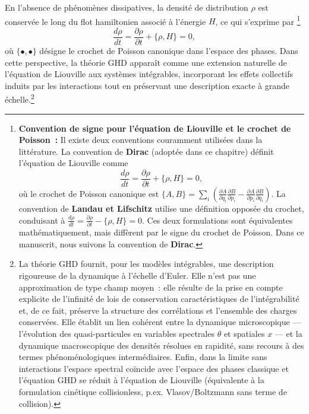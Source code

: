 En l’absence de phénomènes dissipatives, la densité de distribution $\rho$ est conservée le long du flot hamiltonien associé à l’énergie $H$, ce qui s’exprime par
\footnote{
	\textbf{Convention de signe pour l'équation de Liouville et le crochet de Poisson~:}
	Il existe deux conventions couramment utilisées dans la littérature. 
	La convention de \textbf{Dirac} (adoptée dans ce chapitre) définit l'équation de Liouville comme
	\[
	\frac{d\rho}{dt} = \frac{\partial\rho}{\partial t} + \{\rho, H\} = 0,
	\]
	où le crochet de Poisson canonique est $\{A,B\} = \sum_i \left(\frac{\partial A}{\partial q_i}\frac{\partial B}{\partial p_i} - \frac{\partial A}{\partial p_i}\frac{\partial B}{\partial q_i}\right)$.
	La convention de \textbf{Landau et Lifschitz} utilise une définition opposée du crochet, conduisant à $\frac{d\rho}{dt} = \frac{\partial\rho}{\partial t} - \{\rho, H\} = 0$.
	Ces deux formulations sont équivalentes mathématiquement, mais diffèrent par le signe du crochet de Poisson. 
	Dans ce manuscrit, nous suivons la convention de \textbf{Dirac}.
}
\begin{equation}\label{chap:GHD:eq.Liouv.1}
	\frac{d \rho}{dt} 
	= \frac{\partial \rho}{\partial t } + \{ \rho , H \} = 0,
\end{equation}
où $\{\bullet, \bullet\}$ désigne le crochet de Poisson canonique dans l’espace des phases.  
Dans cette perspective, la théorie \gls{GHD} apparaît comme une extension naturelle de l’équation de Liouville aux systèmes intégrables, incorporant les effets collectifs induits par les interactions tout en préservant une description exacte à grande échelle.\footnote{La théorie \gls{GHD} fournit, pour les modèles intégrables, une description rigoureuse de la dynamique à l'échelle d'Euler. Elle n'est pas une approximation de type champ moyen : elle résulte de la prise en compte explicite de l'infinité de lois de conservation caractéristiques de l'intégrabilité et, de ce fait, préserve la structure des corrélations et l'ensemble des charges conservées. Elle établit un lien cohérent entre la dynamique microscopique — l'évolution des quasi‑particules en variables spectrales \(\theta\) et spatiales \(x\) — et la dynamique macroscopique des densités résolues en rapidité, sans recours à des termes phénoménologiques intermédiaires. Enfin, dans la limite sans interactions l'espace spectral coïncide avec l'espace des phases classique et l'équation \gls{GHD} se réduit à l'équation de Liouville (équivalente à la formulation cinétique collisionless, p.ex. Vlasov/Boltzmann sans terme de collision).}


